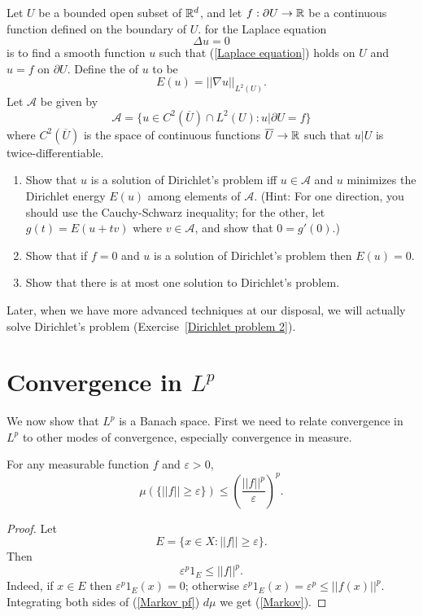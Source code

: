 \begin{exercise}\label{Dirichlet problem}
Let $U$ be a bounded open subset of $\mathbb{R}^d$, and let $f: \partial U \to \mathbb{R}$ be a continuous function defined on the boundary of $U$.
 for the Laplace equation
\begin{equation}\label{Laplace equation}
\Delta u = 0
\end{equation}
is to find a smooth function $u$ such that (\ref{Laplace equation}) holds on $U$ and $u = f$ on $\partial U$.
Define the  of $u$ to be
\[E(u) = ||\nabla u||_{L^2(U)}.\]
Let $\mathcal A$ be given by
\[\mathcal A = \{u \in C^2(\overline U) \cap L^2(U): u|\partial U = f\}\]
where $C^2(\overline U)$ is the space of continuous functions $\overline U \to \mathbb{R}$ such that $u|U$ is twice-differentiable.
\begin{enumerate}
\item Show that $u$ is a solution of Dirichlet's problem iff $u \in \mathcal A$ and $u$ minimizes the Dirichlet energy $E(u)$ among elements of $\mathcal A$.
(Hint: For one direction, you should use the Cauchy-Schwarz inequality; for the other, let $g(t) = E(u + tv)$ where $v \in \mathcal A$, and show that $0 = g'(0)$.)
\item Show that if $f = 0$ and $u$ is a solution of Dirichlet's problem then $E(u) = 0$.
\item Show that there is at most one solution to Dirichlet's problem.
\end{enumerate}
Later, when we have more advanced techniques at our disposal, we will actually solve Dirichlet's problem (Exercise~\ref{Dirichlet problem 2}).
\end{exercise}

\section{Convergence in $L^p$}
We now show that $L^p$ is a Banach space.
First we need to relate convergence in $L^p$ to other modes of convergence, especially convergence in measure.

\begin{theorem}
For any measurable function $f$ and $\varepsilon > 0$,
\begin{equation}\label{Markov}
\mu(\{||f|| \geq \varepsilon\}) \leq \left(\frac{||f||^p}{\varepsilon}\right)^p.
\end{equation}
\end{theorem}
\begin{proof}
Let
\[E = \{x \in X: ||f|| \geq \varepsilon\}.\]
Then
\begin{equation}\label{Markov pf}
\varepsilon^{p} 1_{E} \leq ||f||^p.
\end{equation}
Indeed, if $x \in E$ then $\varepsilon^{p} 1_E(x) = 0$; otherwise $\varepsilon^{p} 1_E(x) = \varepsilon^{p} \leq ||f(x)||^p$.
Integrating both sides of (\ref{Markov pf}) $d\mu$ we get (\ref{Markov}).
\end{proof}

